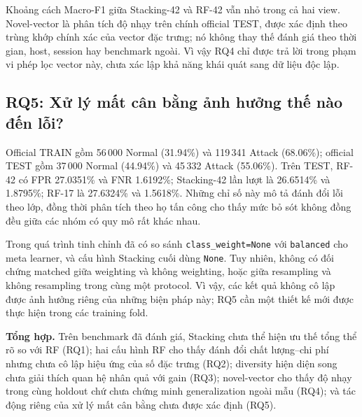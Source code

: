 Khoảng cách Macro-F1 giữa Stacking-42 và RF-42 vẫn nhỏ trong cả hai view. Novel-vector là phân tích độ nhạy trên chính official TEST, được xác định theo trùng khớp chính xác của vector đặc trưng; nó không thay thế đánh giá theo thời gian, host, session hay benchmark ngoài. Vì vậy RQ4 chỉ được trả lời trong phạm vi phép lọc vector này, chưa xác lập khả năng khái quát sang dữ liệu độc lập.

\subsection{RQ5: Xử lý mất cân bằng ảnh hưởng thế nào đến lỗi?}
\label{sec:revision-rq5}
Official TRAIN gồm 56\,000 Normal (31.94\%) và 119\,341 Attack (68.06\%); official TEST gồm 37\,000 Normal (44.94\%) và 45\,332 Attack (55.06\%). Trên TEST, RF-42 có FPR 27.0351\% và FNR 1.6192\%; Stacking-42 lần lượt là 26.6514\% và 1.8795\%; RF-17 là 27.6324\% và 1.5618\%. Những chỉ số này mô tả đánh đổi lỗi theo lớp, đồng thời phân tích theo họ tấn công cho thấy mức bỏ sót không đồng đều giữa các nhóm có quy mô rất khác nhau.

Trong quá trình tinh chỉnh đã có so sánh \texttt{class\_weight=None} với \texttt{balanced} cho meta learner, và cấu hình Stacking cuối dùng \texttt{None}. Tuy nhiên, không có đối chứng matched giữa weighting và không weighting, hoặc giữa resampling và không resampling trong cùng một protocol. Vì vậy, các kết quả không cô lập được ảnh hưởng riêng của những biện pháp này; RQ5 cần một thiết kế mới được thực hiện trong các training fold.

\noindent\textbf{Tổng hợp.} Trên benchmark đã đánh giá, Stacking chưa thể hiện ưu thế tổng thể rõ so với RF (RQ1); hai cấu hình RF cho thấy đánh đổi chất lượng--chi phí nhưng chưa cô lập hiệu ứng của số đặc trưng (RQ2); diversity hiện diện song chưa giải thích quan hệ nhân quả với gain (RQ3); novel-vector cho thấy độ nhạy trong cùng holdout chứ chưa chứng minh generalization ngoài mẫu (RQ4); và tác động riêng của xử lý mất cân bằng chưa được xác định (RQ5).
